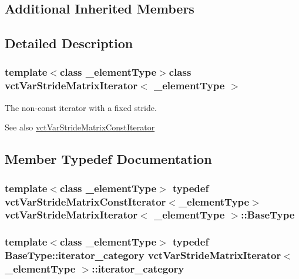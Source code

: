 \subsection*{Additional Inherited Members}


\subsection{Detailed Description}
\subsubsection*{template$<$class \+\_\+element\+Type$>$class vct\+Var\+Stride\+Matrix\+Iterator$<$ \+\_\+element\+Type $>$}

The non-\/const iterator with a fixed stride. \begin{DoxySeeAlso}{See also}
\hyperlink{classvct_var_stride_matrix_const_iterator}{vct\+Var\+Stride\+Matrix\+Const\+Iterator} 
\end{DoxySeeAlso}


\subsection{Member Typedef Documentation}
\hypertarget{classvct_var_stride_matrix_iterator_adfcc105f210fef52621dd5ea9fe8b937}{}
\subsubsection[{Base\+Type}]{\setlength{\rightskip}{0pt plus 5cm}template$<$class \+\_\+element\+Type$>$ typedef {\bf vct\+Var\+Stride\+Matrix\+Const\+Iterator}$<$\+\_\+element\+Type$>$ {\bf vct\+Var\+Stride\+Matrix\+Iterator}$<$ \+\_\+element\+Type $>$\+::{\bf Base\+Type}}\label{classvct_var_stride_matrix_iterator_adfcc105f210fef52621dd5ea9fe8b937}
\hypertarget{classvct_var_stride_matrix_iterator_a4666721e510380bfb3c0947d8d37eab9}{}
\subsubsection[{iterator\+\_\+category}]{\setlength{\rightskip}{0pt plus 5cm}template$<$class \+\_\+element\+Type$>$ typedef Base\+Type\+::iterator\+\_\+category {\bf vct\+Var\+Stride\+Matrix\+Iterator}$<$ \+\_\+element\+Type $>$\+::{\bf iterator\+\_\+category}}\label{classvct_var_stride_matrix_iterator_a4666721e510380bfb3c0947d8d37eab9}
\hypertarget{classvct_var_stride_matrix_iterator_a70b8fef02244dad380a0836d86afdd3e}{}
